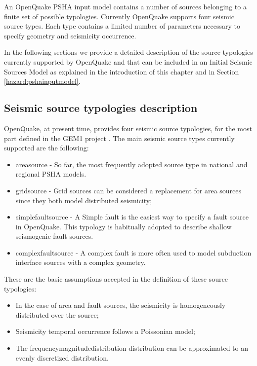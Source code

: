 An OpenQuake PSHA input model contains a number of sources belonging 
to a finite set of possible typologies. Currently OpenQuake supports 
four seismic source types. Each type contains a limited number of 
parameters necessary to specify geometry and seismicity occurrence. 

In the following sections we provide a detailed description of the 
source typologies currently supported by OpenQuake and that can be 
included in an Initial Seismic Sources Model as explained in the 
introduction of this chapter and in Section \ref{hazard:pshainputmodel}.
%
\subsection{Seismic source typologies description}
\label{sec:seismic_source_descr}
%
OpenQuake, at present time, provides four seismic source typologies, 
for the most part defined in the GEM1 project \citep{pagani2010}. 
%
The main seismic source types currently supported are the following:
\begin{itemize}
\item \Gls{areasource} - So far, the most frequently adopted source 
type in national and regional PSHA models.
\item \Gls{gridsource} - Grid sources can be considered a replacement 
for area sources since they both model distributed seismicity;
\item \Gls{simplefaultsource} - A Simple fault is the easiest way to
specify a fault source in OpenQuake. This typology is habitually adopted 
to describe shallow seismogenic fault sources.
\item \Gls{complexfaultsource} - A complex fault is more often used 
to model subduction interface sources with a complex geometry. 
\end{itemize}

These are the basic assumptions accepted in the definition of these source 
typologies:
\begin{itemize}
\item In the case of area and fault sources, the seismicity is homogeneously 
distributed over the source; 
\item Seismicity temporal occurrence follows a Poissonian model; 
\item The \gls{frequencymagnitudedistribution} distribution can be approximated to an evenly 
discretized distribution. 
\end{itemize}
%
